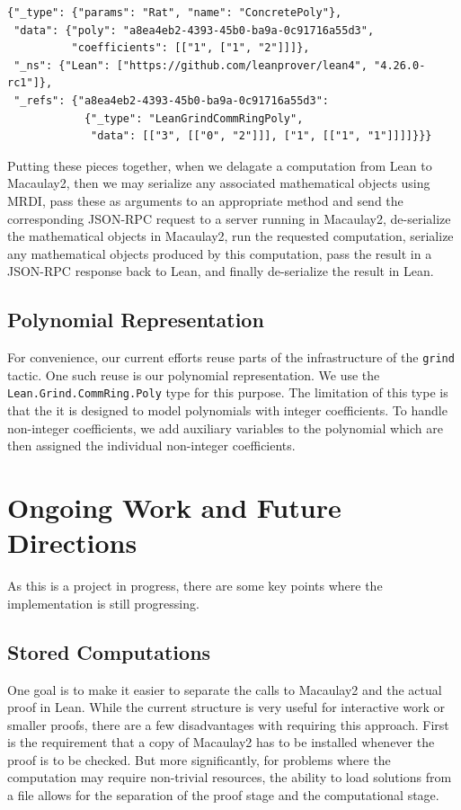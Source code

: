 \documentclass[runningheads]{llncs}
\begin{document}
\begin{verbatim}
{"_type": {"params": "Rat", "name": "ConcretePoly"},
 "data": {"poly": "a8ea4eb2-4393-45b0-ba9a-0c91716a55d3",
          "coefficients": [["1", ["1", "2"]]]},
 "_ns": {"Lean": ["https://github.com/leanprover/lean4", "4.26.0-rc1"]},
 "_refs": {"a8ea4eb2-4393-45b0-ba9a-0c91716a55d3":
            {"_type": "LeanGrindCommRingPoly",
             "data": [["3", [["0", "2"]]], ["1", [["1", "1"]]]]}}}
\end{verbatim}

Putting these pieces together, when we delagate a computation from Lean to Macaulay2, then we may serialize any associated mathematical objects using MRDI, pass these as arguments to an appropriate method and send the corresponding JSON-RPC request to a server running in Macaulay2, de-serialize the mathematical objects in Macaulay2, run the requested computation, serialize any mathematical objects produced by this computation, pass the result in a JSON-RPC response back to Lean, and finally de-serialize the result in Lean.

\subsection*{Polynomial Representation}

For convenience, our current efforts reuse parts of the infrastructure of the \verb|grind| tactic. One such reuse is our polynomial representation. We use the \texttt{Lean.Grind.CommRing.Poly} type for this purpose. The limitation of this type is that the it is designed to model polynomials with integer coefficients. To handle non-integer coefficients,  we add auxiliary variables to the polynomial which are then assigned the individual non-integer coefficients.

\section{Ongoing Work and Future Directions}
\label{sec:future}

As this is a project in progress, there are some key points where the implementation is still progressing.

\subsection*{Stored Computations}
One goal is to make it easier to separate the calls to Macaulay2 and the actual proof in Lean. While the current structure is very useful for interactive work or smaller proofs, there are a few disadvantages with requiring this approach. First is the requirement that a copy of Macaulay2 has to be installed whenever the proof is to be checked. But more significantly, for problems where the computation may require non-trivial resources, the ability to load solutions from a file allows for the separation of the proof stage and the computational stage.
\end{document}
